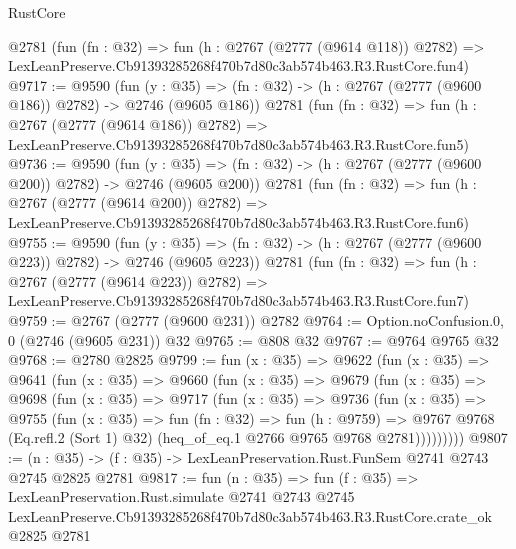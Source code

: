 \begin{lexlean}{RustCore}
\begin{coremodule}
    @2781
    (fun (fn : @32) =>
    fun (h : @2767 (@2777 (@9614 @118)) @2782) =>
    LexLeanPreserve.Cb91393285268f470b7d80c3ab574b463.R3.RustCore.fun4)
@9717 := @9590
    (fun (y : @35) => (fn : @32) -> (h : @2767 (@2777 (@9600 @186)) @2782) -> @2746 (@9605 @186))
    @2781
    (fun (fn : @32) =>
    fun (h : @2767 (@2777 (@9614 @186)) @2782) =>
    LexLeanPreserve.Cb91393285268f470b7d80c3ab574b463.R3.RustCore.fun5)
@9736 := @9590
    (fun (y : @35) => (fn : @32) -> (h : @2767 (@2777 (@9600 @200)) @2782) -> @2746 (@9605 @200))
    @2781
    (fun (fn : @32) =>
    fun (h : @2767 (@2777 (@9614 @200)) @2782) =>
    LexLeanPreserve.Cb91393285268f470b7d80c3ab574b463.R3.RustCore.fun6)
@9755 := @9590
    (fun (y : @35) => (fn : @32) -> (h : @2767 (@2777 (@9600 @223)) @2782) -> @2746 (@9605 @223))
    @2781
    (fun (fn : @32) =>
    fun (h : @2767 (@2777 (@9614 @223)) @2782) =>
    LexLeanPreserve.Cb91393285268f470b7d80c3ab574b463.R3.RustCore.fun7)
@9759 := @2767 (@2777 (@9600 @231)) @2782
@9764 := Option.noConfusion.{0, 0} (@2746 (@9605 @231)) @32
@9765 := @808 @32
@9767 := @9764 @9765 @32
@9768 := @2780 @2825
@9799 := fun (x : @35) =>
  @9622
    (fun (x : @35) =>
    @9641
      (fun (x : @35) =>
      @9660
        (fun (x : @35) =>
        @9679
          (fun (x : @35) =>
          @9698
            (fun (x : @35) =>
            @9717
              (fun (x : @35) =>
              @9736
                (fun (x : @35) =>
                @9755
                  (fun (x : @35) =>
                  fun (fn : @32) =>
                  fun (h : @9759) =>
                  @9767
                    @9768
                    (Eq.refl.{2} (Sort 1) @32)
                    (heq_of_eq.{1} @2766 @9765 @9768 @2781)))))))))
@9807 := (n : @35) -> (f : @35) -> LexLeanPreservation.Rust.FunSem @2741 @2743 @2745 @2825 @2781
@9817 := fun (n : @35) =>
  fun (f : @35) =>
  LexLeanPreservation.Rust.simulate
    @2741
    @2743
    @2745
    LexLeanPreserve.Cb91393285268f470b7d80c3ab574b463.R3.RustCore.crate_ok
    @2825
    @2781
\end{coremodule}
\end{lexlean}
